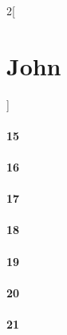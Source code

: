 \documentclass{book}
\begin{document}
\begin{multicols}{2}[\part{John}]
\subsection*{15}
\subsection*{16}
\subsection*{17}
\subsection*{18}
\subsection*{19}
\subsection*{20}
\subsection*{21}
\end{multicols}
\end{document}
